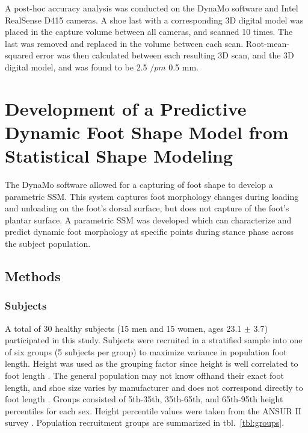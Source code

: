 \documentclass[defaultstyle,11pt]{comps}
\begin{document}
A post-hoc accuracy analysis was conducted on the DynaMo software and Intel RealSense D415 cameras.
A shoe last with a corresponding 3D digital model was placed in the capture volume between all cameras, and scanned 10 times.
The last was removed and replaced in the volume between each scan.
Root-mean-squared error was then calculated between each resulting 3D scan, and the 3D digital model, and was found to be 2.5 \(/pm\) 0.5 mm.

\hypertarget{development-of-a-predictive-dynamic-foot-shape-model-from-statistical-shape-modeling}{%
\section{Development of a Predictive Dynamic Foot Shape Model from Statistical Shape Modeling}\label{development-of-a-predictive-dynamic-foot-shape-model-from-statistical-shape-modeling}}

The DynaMo software \citep{Boppana2019} allowed for a capturing of foot shape to develop a parametric SSM.
This system captures foot morphology changes during loading and unloading on the foot's dorsal surface, but does not capture of the foot's plantar surface.
A parametric SSM was developed which can characterize and predict dynamic foot morphology at specific points during stance phase across the subject population.

\hypertarget{methods-1}{%
\subsection{Methods}\label{methods-1}}

\hypertarget{subjects}{%
\subsubsection{Subjects}\label{subjects}}

A total of 30 healthy subjects (15 men and 15 women, ages 23.1 \(\pm\) 3.7) participated in this study.
Subjects were recruited in a stratified sample into one of six groups (5 subjects per group) to maximize variance in population foot length.
Height was used as the grouping factor since height is well correlated to foot length \citep{Giles1991}. The general population may not know offhand their exact foot length, and shoe size varies by manufacturer and does not correspond directly to foot length \citep{Jurca2013, Wannop2019}. Groups consisted of 5th-35th, 35th-65th, and 65th-95th height percentiles for each sex.
Height percentile values were taken from the ANSUR II survey \citep{Gordon2014}.
Population recruitment groups are summarized in tbl.~\ref{tbl:groups}.
\end{document}

